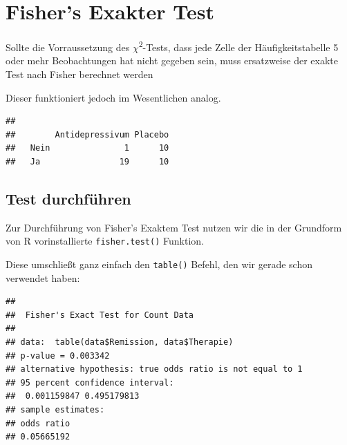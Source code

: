 \documentclass[
]{book}
\newenvironment{Shaded}{\begin{snugshade}}{\end{snugshade}}
\newcommand{\FunctionTok}[1]{\textcolor[rgb]{0.13,0.29,0.53}{\textbf{#1}}}
\newcommand{\NormalTok}[1]{#1}
\newcommand{\SpecialCharTok}[1]{\textcolor[rgb]{0.81,0.36,0.00}{\textbf{#1}}}
\begin{document}
\section{Fisher's Exakter Test}\label{fishers-exakter-test}

Sollte die Vorraussetzung des \(\chi\)\textsuperscript{2}-Tests, dass jede Zelle der Häufigkeitstabelle 5 oder mehr Beobachtungen hat nicht gegeben sein, muss ersatzweise der exakte Test nach Fisher berechnet werden

Dieser funktioniert jedoch im Wesentlichen analog.

\begin{Shaded}
\end{Shaded}

\begin{verbatim}
##       
##        Antidepressivum Placebo
##   Nein               1      10
##   Ja                19      10
\end{verbatim}

\subsection{Test durchführen}\label{test-durchfuxfchren-6}

Zur Durchführung von Fisher's Exaktem Test nutzen wir die in der Grundform von R vorinstallierte \texttt{fisher.test()} Funktion.

Diese umschließt ganz einfach den \texttt{table()} Befehl, den wir gerade schon verwendet haben:

\begin{Shaded}
\end{Shaded}

\begin{verbatim}
## 
##  Fisher's Exact Test for Count Data
## 
## data:  table(data$Remission, data$Therapie)
## p-value = 0.003342
## alternative hypothesis: true odds ratio is not equal to 1
## 95 percent confidence interval:
##  0.001159847 0.495179813
## sample estimates:
## odds ratio 
## 0.05665192
\end{verbatim}
\end{document}
